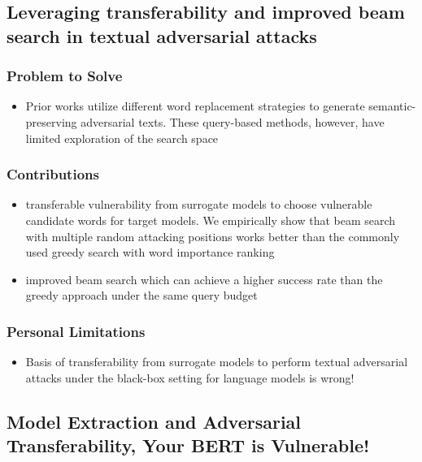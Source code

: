 \documentclass{article}
\begin{document}
\begin{flushleft}



\subsection{Leveraging transferability and improved beam search in textual adversarial attacks   \cite{zhu2022leveraging}} 
\subsubsection*{Problem to Solve}
\begin{itemize}
    \item Prior works utilize different word replacement strategies to generate semantic-preserving adversarial texts. These query-based methods, however, have limited exploration of the search space
\end{itemize}

\subsubsection*{Contributions}
\begin{itemize}
  \item  transferable vulnerability from surrogate models to choose vulnerable candidate words for target models. We empirically show that beam search with multiple random attacking positions works better than the commonly used greedy search with word importance ranking
  \item improved beam search which can achieve a higher success rate than the greedy approach under the same query budget
\end{itemize}


\subsubsection*{Personal Limitations}
\begin{itemize}
    \item Basis of transferability from surrogate models to perform textual adversarial attacks under the black-box setting for language models is wrong!
\end{itemize}






 \subsection{Model Extraction and Adversarial Transferability, Your BERT is Vulnerable!  \cite{}} 

\end{flushleft}
\end{document}
